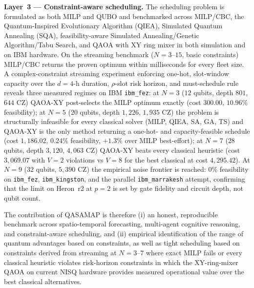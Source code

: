 \textbf{Layer~3 --- Constraint-aware scheduling.} The scheduling problem is formulated as both MILP and QUBO and benchmarked across MILP/CBC, the Quantum-Inspired Evolutionary Algorithm (QIEA), Simulated Quantum Annealing (SQA), feasibility-aware Simulated Annealing/Genetic Algorithm/Tabu Search, and QAOA with XY ring mixer in both simulation and on IBM hardware. On the streaming benchmark ($N=3$--$15$, basic constraints) MILP/CBC returns the proven optimum within milliseconds for every fleet size. A complex-constraint streaming experiment enforcing one-hot, slot-window capacity over the $d=4$-h duration, $\rho$-slot risk horizon, and must-schedule rule reveals three measured regimes on IBM \texttt{ibm\_fez}: at $N=3$ ($12$ qubits, depth $801$, $644$ CZ) QAOA-XY post-selects the MILP optimum exactly (cost $300.00$, $10.96\%$ feasibility); at $N=5$ ($20$ qubits, depth $1{,}226$, $1{,}935$ CZ) the problem is structurally infeasible for every classical solver (MILP, QIEA, SA, GA, TS) and QAOA-XY is the only method returning a one-hot- and capacity-feasible schedule (cost $1{,}186.02$, $0.24\%$ feasibility, $+1.3\%$ over MILP best-effort); at $N=7$ ($28$ qubits, depth $3{,}120$, $4{,}063$ CZ) QAOA-XY beats every classical heuristic (cost $3{,}069.07$ with $V=2$ violations vs $V=8$ for the best classical at cost $4{,}295.42$). At $N=9$ ($32$ qubits, $5{,}390$ CZ) the empirical noise frontier is reached: $0\%$ feasibility on \texttt{ibm\_fez}, \texttt{ibm\_kingston}, and the parallel \texttt{ibm\_marrakesh} attempt, confirming that the limit on Heron~r2 at $p=2$ is set by gate fidelity and circuit depth, not qubit count.

The contribution of QASAMAP is therefore (i) an honest, reproducible benchmark across spatio-temporal forecasting, multi-agent cognitive reasoning, and constraint-aware scheduling, and (ii) empirical identification of the range of quantum advantages based on constraints, as well as tight scheduling based on constraints derived from streaming at $N=3$--$7$ where exact MILP fails or every classical heuristic violates risk-horizon constraints in which the XY-ring-mixer QAOA on current NISQ hardware provides measured operational value over the best classical alternatives.
